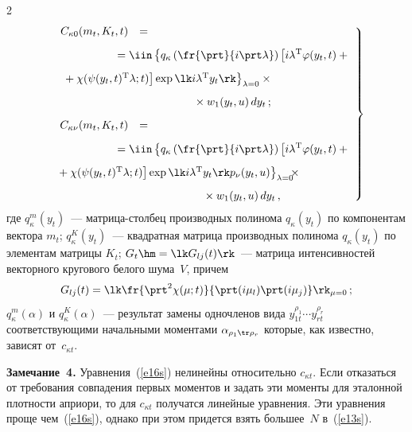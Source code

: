 \begin{multicols}{2}
\noindent
\begin{equation}
\left.
\begin{array}{rl}
C_{\kappa 0}(m_t, K_t, t) &={}\\[9pt]
&\hspace*{-8mm}{}=\displaystyle \iin \left\{ q_\kappa \left( \fr{\prt}{i\prt \lambda}\right) 
\left[ i\lambda^{\mathrm{T}} \varphi(y_t, t) +{}\right.\right.\\[9pt]
&\hspace*{-25mm}\left.\left.{}+\chi(\psi(y_t, t)^{\mathrm{T}} \lambda;t)\right]\exp 
\lk i\lambda^{\mathrm{T}} y_t\rk \vphantom{\fr{\partial}{\partial}}
\right\}_{\lambda=0}\times{}\\[9pt]
&\hspace*{17mm}{}\times w_1(y_t,u)\, dy_t\,;\\[9pt]
C_{\kappa \nu}(m_t, K_t, t) &={}\\[9pt]
&\hspace*{-8mm}{}=\displaystyle \iin \left\{ q_\kappa \left( \fr{\prt}{i\prt \lambda}\right) 
\left[ i\lambda^{\mathrm{T}} \varphi(y_t, t) +{}\right.\right.\\[9pt]
&\hspace*{-27mm}\left.\left.{}+\chi(\psi(y_t, t)^{\mathrm{T}} \lambda;t)\right]\exp 
\lk i\lambda^{\mathrm{T}} y_t\rk p_\nu (y_t,u)
\vphantom{\fr{\partial}{\partial}}
\right\}_{\lambda=0}\!\!\!\times{}\\[9pt]
&\hspace*{20mm}{}\times w_1(y_t,u)\, dy_t\,,
\end{array}\!\!
\right\}\!\!
\label{e17-1s}
\end{equation}
где $q_\kappa^m (y_t)$~--- мат\-ри\-ца-стол\-бец производных полинома  $q_\kappa (y_t)$ 
по компонентам вектора  $m_t$; $q_\kappa^K (y_t)$~--- квадратная мат\-ри\-ца 
производных полинома  $q_\kappa (y_t)$ по элементам мат\-ри\-цы  $K_t$; 
$G_t \hm= \lk G_{lj} (t)\rk$~--- мат\-ри\-ца интенсивностей векторного кругового белого шума~$V$, 
причем
    $$
    G_{lj} (t) = \lk \fr{\prt^2 \chi (\mu;t)}{\prt (i\mu_l) \prt (i\mu_j)}\rk_{\mu=0}\,;
    $$
$q_\kappa^m(\alpha)$  и $q_\kappa^K(\alpha)$~--- 
результат замены одночленов вида $y_{1t}^{\rho_1}\cdots y_{rt}^{\rho_r}$ 
соответствующими  начальными моментами $\alpha_{\rho_1 \tr \rho_r}$ которые, 
как известно, зависят от~$c_{\kappa t}$.

\medskip
\noindent
\textbf{Замечание~4.} Уравнения~(\ref{e16s}) нелинейны относительно  $c_{\kappa t}$. 
Если отказаться от требования совпадения первых  моментов и задать эти моменты для 
эталонной плотности априори, то для  $c_{\kappa t}$ получатся линейные уравнения. 
Эти уравнения проще чем~(\ref{e16s}), однако при этом придется взять большее~$N$ в~(\ref{e13s}).


\end{multicols}
